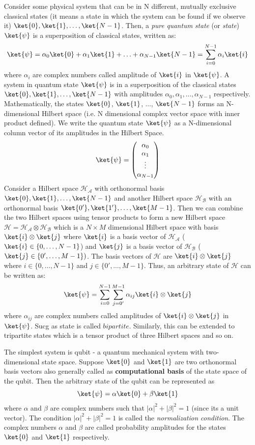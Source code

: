 \documentclass[12pt, oneside]{book}
\theoremstyle{definition}
\theoremstyle{definition}
\theoremstyle{remark}
\begin{document}
Consider some physical system that can be in N different, mutually exclusive classical states (it means a state in which the system can be found 
if we observe it) $\ket{0},\ket{1},\ldots,\ket{N-1}$. Then, a \textit{pure quantum state} (or \textit{state}) $\ket{\psi}$ is a superposition of classical states, written as:
\[
    \ket{\psi}=\alpha_0\ket{0}+\alpha_1\ket{1}+\ldots+\alpha_{N-1}\ket{N-1} = \sum_{i=0}^{N-1}\alpha_i\ket{i}
\]
where $\alpha_i$ are complex numbers called amplitude of $\ket{i}$ in $\ket{\psi}$. A system in quantum state
$\ket{\psi}$ is in a superposition of the classical states $\ket{0},\ket{1},\ldots,\ket{N-1}$ with amplitudes $\alpha_0,\alpha_1,\ldots,\alpha_{N-1}$ respectively.
Mathematically, the states $\ket{0}$, $\ket{1}$, $\ldots$, $\ket{N-1}$ forms an N-dimensional Hilbert space (i.e. N dimensional complex vector space with inner product defined).
We write the quantum state $\ket{\psi}$ as a N-dimensional column vector of its amplitudes in the Hilbert Space.
\[ 
    \ket{\psi}=\begin{pmatrix} \alpha_0 \\ \alpha_1 \\ \vdots \\ \alpha_{N-1} \end{pmatrix}
\]
Consider a Hilbert space $\mathcal{H_A}$ with orthonormal basis $\ket{0},\ket{1},\ldots,\ket{N-1}$
and another Hilbert space $\mathcal{H_B}$ with an orthonormal basis $\ket{0'},\ket{1'},\ldots,\ket{M-1}$. Then we can
combine the two Hilbert spaces using tensor products to form a new Hilbert space $\mathcal{H}=\mathcal{H_A}\otimes\mathcal{H_B}$ which
is a $N\times M$ dimensional Hilbert space with basis $\ket{i}\otimes\ket{j}$ where $\ket{i}$ is a basis vector of $\mathcal{H_A}$ ($\ket{i} \in \{0,\ldots,N-1\}$) 
and $\ket{j}$ is a basis vector of $\mathcal{H_B}$ ($\ket{j} \in \{0',\ldots,M-1\})$. The basis vectors of $\mathcal{H}$ are $\ket{i}\otimes\ket{j}$ where $i \in \{0,\ldots,N-1\}$ and $j \in \{0',\ldots,M-1\}$.
Thus, an arbitrary state of $\mathcal{H}$ can be written as:
\[
    \ket{\psi}=\sum_{i=0}^{N-1}\sum_{j=0'}^{M-1}\alpha_{ij}\ket{i}\otimes\ket{j}
\]
where $\alpha_{ij}$ are complex numbers called amplitudes of $\ket{i}\otimes\ket{j}$ in $\ket{\psi}$.
Sucg as state is called $\mathit{bipartite}$. Similarly, this can be extended to tripartite states which is a tensor product of three Hilbert spaces and so on.

The simplest system is qubit - a quantum mechanical system with two-dimensional state space. Suppose $\ket{0}$ and
$\ket{1}$ are two orthonormal basis vectors also generally called as \textbf{computational basis} of the state space of the qubit. Then the arbitrary state of the qubit can be represented as
\[
    \ket{\psi}=\alpha\ket{0}+\beta\ket{1}
\]
where $\alpha$ and $\beta$ are complex numbers such that $|\alpha|^2+|\beta|^2=1$ (since its a unit vector). The condition 
$|\alpha|^2+|\beta|^2=1$ is called the \textit{normalization condition}. The complex numbers $\alpha$ and $\beta$ are called probability amplitudes
for the states $\ket{0}$ and $\ket{1}$ respectively.
\end{document}
